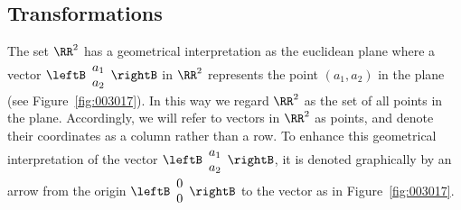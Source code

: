 %
%

\subsection*{Transformations}

The set $\RR^2$ has a geometrical interpretation as the euclidean plane where a vector $\leftB \begin{array}{c}
a_{1} \\
a_{2}
\end{array} \rightB$
 in $\RR^2$ represents the point $(a_{1}, a_{2})$ in the plane (see Figure~\ref{fig:003017}). In this way we regard $\RR^2$ as the set of all points in the plane. Accordingly, we will refer to vectors in $\RR^2$ as points, and denote their coordinates as a column rather than a row. To enhance this geometrical interpretation of the vector $\leftB \begin{array}{c}
a_{1} \\
a_{2}
\end{array} \rightB$, it is denoted graphically by an arrow from the origin $\leftB \begin{array}{c}
 0 \\
 0
 \end{array} \rightB$
 to the vector as in Figure~\ref{fig:003017}.

\begin{figure}[H]
\centering
\begin{minipage}{0.45\textwidth}
\centering

\caption{\label{fig:003017}}
\end{minipage}
\hspace*{3em}
\begin{minipage}{0.45\textwidth}
\centering

\caption{\label{fig:003025}}
\end{minipage}
\end{figure}


